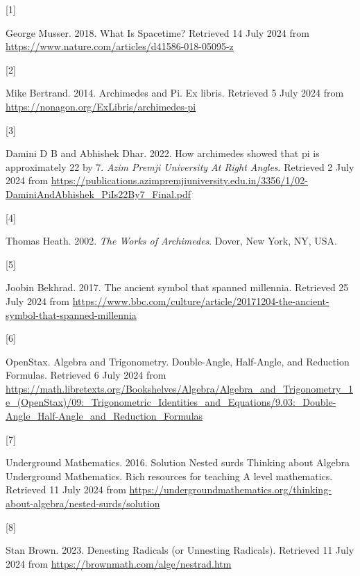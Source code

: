 \documentclass[
  a4paper,
]{article}
\newlength{\cslhangindent}
\newlength{\csllabelwidth}
\newenvironment{CSLReferences}[2] %
 {\begin{list}{}{%
  \setlength{\itemindent}{0pt}
  \setlength{\leftmargin}{0pt}
  \setlength{\parsep}{0pt}
  \ifodd #1
   \setlength{\leftmargin}{\cslhangindent}
   \setlength{\itemindent}{-1\cslhangindent}
  \fi
  \setlength{\itemsep}{#2\baselineskip}}}
 {\end{list}}
\newcommand{\CSLLeftMargin}[1]{\parbox[t]{\csllabelwidth}{\strut#1\strut}}
\newcommand{\CSLRightInline}[1]{\parbox[t]{\linewidth - \csllabelwidth}{\strut#1\strut}}
\begin{document}
\label{refs}
\begin{CSLReferences}{0}{0}
\CSLLeftMargin{{[}1{]} }%
\CSLRightInline{George Musser. 2018. {What Is Spacetime?} Retrieved 14
July 2024 from \url{https://www.nature.com/articles/d41586-018-05095-z}}

\CSLLeftMargin{{[}2{]} }%
\CSLRightInline{Mike Bertrand. 2014. {Archimedes and Pi}. Ex libris.
Retrieved 5 July 2024 from
\url{https://nonagon.org/ExLibris/archimedes-pi}}

\CSLLeftMargin{{[}3{]} }%
\CSLRightInline{Damini D B and Abhishek Dhar. 2022. How archimedes
showed that pi is approximately 22 by 7. \emph{{Azim Premji University
At Right Angles}}. Retrieved 2 July 2024 from
\url{https://publications.azimpremjiuniversity.edu.in/3356/1/02-DaminiAndAbhishek_PiIs22By7_Final.pdf}}

\CSLLeftMargin{{[}4{]} }%
\CSLRightInline{Thomas Heath. 2002. \emph{{The Works of Archimedes}}.
Dover, New York, NY, USA.}

\CSLLeftMargin{{[}5{]} }%
\CSLRightInline{Joobin Bekhrad. 2017. The ancient symbol that spanned
millennia. Retrieved 25 July 2024 from
\url{https://www.bbc.com/culture/article/20171204-the-ancient-symbol-that-spanned-millennia}}

\CSLLeftMargin{{[}6{]} }%
\CSLRightInline{OpenStax. {Algebra and Trigonometry}. {Double-Angle,
Half-Angle, and Reduction Formulas}. Retrieved 6 July 2024 from
\url{https://math.libretexts.org/Bookshelves/Algebra/Algebra_and_Trigonometry_1e_(OpenStax)/09:_Trigonometric_Identities_and_Equations/9.03:_Double-Angle_Half-Angle_and_Reduction_Formulas}}

\CSLLeftMargin{{[}7{]} }%
\CSLRightInline{Underground Mathematics. 2016. {Solution \textbar{}
Nested surds \textbar{} Thinking about Algebra \textbar{} Underground
Mathematics}. {Rich resources for teaching A level mathematics}.
Retrieved 11 July 2024 from
\url{https://undergroundmathematics.org/thinking-about-algebra/nested-surds/solution}}

\CSLLeftMargin{{[}8{]} }%
\CSLRightInline{Stan Brown. 2023. {Denesting Radicals (or Unnesting
Radicals)}. Retrieved 11 July 2024 from
\url{https://brownmath.com/alge/nestrad.htm}}


\end{CSLReferences}
\end{document}

